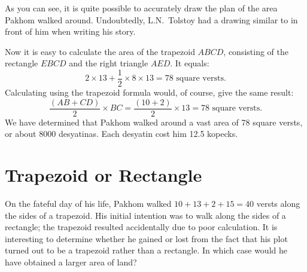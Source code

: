 As you can see, it is quite possible to accurately draw the plan of the area Pakhom walked around. Undoubtedly, L.N.~Tolstoy had a drawing similar to  in front of him when writing his story.

Now it is easy to calculate the area of the trapezoid $ABCD$, consisting of the rectangle $EBCD$ and the right triangle $AED$. It equals:
\begin{equation*}%
2 \times 13 + \frac{1}{2} \times 8 \times 13 = 78 \,\,\text{square versts}.
\end{equation*}
Calculating using the trapezoid formula would, of course, give the same result:
\begin{equation*}%
\frac{(AB + CD)}{2} \times BC = \frac{(10 + 2)}{2} \times 13  = 78 \,\,\text{square versts}.
\end{equation*}
We have determined that Pakhom walked around a vast area of 78 square versts, or about 8000 desyatinas. Each desyatin cost him 12.5 kopecks.

\section{Trapezoid or Rectangle}
\label{sec-12.3}


\ques On the fateful day of his life, Pakhom walked $10 + 13 + 2 + 15 = 40$ versts along the sides of a trapezoid. His initial intention was to walk along the sides of a rectangle; the trapezoid resulted accidentally due to poor calculation. It is interesting to determine whether he gained or lost from the fact that his plot turned out to be a trapezoid rather than a rectangle. In which case would he have obtained a larger area of land?

